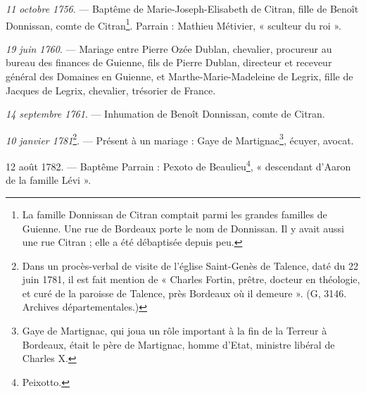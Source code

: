 \documentclass[a4paper,11pt]{book}
\begin{document}
\textit{11 octobre 1756}. — Baptême de Marie-Joseph-Elisabeth de Citran, fille de Benoît Donnissan, comte de Citran\footnote{La famille Donnissan de Citran comptait parmi les grandes familles de Guienne. Une rue de Bordeaux porte le nom de Donnissan. Il y avait aussi une rue Citran ; elle a été débaptisée depuis peu.}. Parrain : Mathieu Métivier, « sculteur du roi ».

\textit{19 juin 1760}. — Mariage entre Pierre Ozée Dublan, chevalier, procureur au bureau des finances de Guienne, fils de Pierre Dublan, directeur et receveur général des Domaines en Guienne, et Marthe-Marie-Madeleine de Legrix, fille de Jacques de Legrix, chevalier, trésorier de France.

\textit{14 septembre 1761}. — Inhumation de Benoît Donnissan, comte de Citran.

\textit{10 janvier 1781}\footnote{Dans un procès-verbal de visite de l'église Saint-Genès de Talence, daté du 22 juin 1781, il est fait mention de « Charles Fortin, prêtre, docteur en théologie, et curé de la paroisse de Talence, près Bordeaux où il demeure ». (G, 3146. Archives départementales.)}. — Présent à un mariage : Gaye de Martignac\footnote{Gaye de Martignac, qui joua un rôle important à la fin de la Terreur à Bordeaux, était le père de Martignac, homme d'Etat, ministre libéral de Charles X.}, écuyer, avocat.

12 août 1782. — Baptême Parrain : Pexoto de Beaulieu\footnote{Peixotto.}, « descendant d'Aaron de la famille Lévi ».
\end{document}
